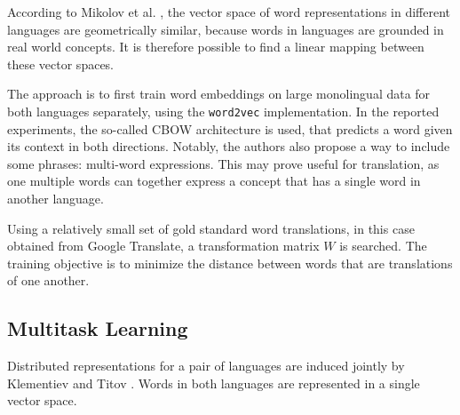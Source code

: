 \documentclass[twocolumn]{article}
\begin{document}
According to Mikolov et al. \cite{mikolov2013exploiting}, the vector space of word representations in different languages are geometrically similar, because words in languages are grounded in real world concepts.
It is therefore possible to find a linear mapping 
between these vector spaces.

The approach is to first train word embeddings on large monolingual data for both languages separately, using the \texttt{word2vec} implementation. In the reported experiments, the so-called CBOW architecture is used, that predicts a word given its context in both directions. 
Notably, the authors also propose a way to include some phrases: multi-word expressions. This may prove useful for translation, as one multiple words can together express a concept that has a single word in another language.

Using a relatively small set of gold standard word translations, in this case obtained from Google Translate, a transformation matrix $W$ is searched. The training objective is to minimize the distance between words that are translations of one another.



\subsection{Multitask Learning}
Distributed representations for a pair of languages are induced jointly by Klementiev and Titov \cite{klementiev2012inducing}. Words in both languages are represented in a single vector space.
\end{document}
